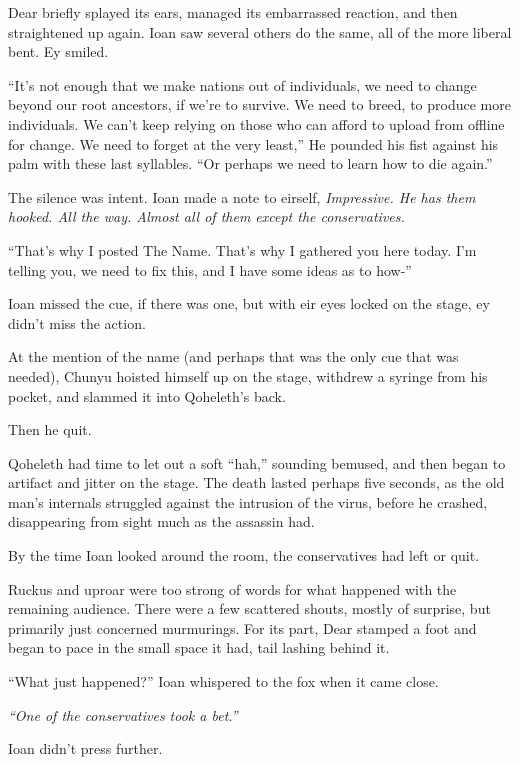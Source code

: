 Dear briefly splayed its ears, managed its embarrassed reaction, and then straightened up again. Ioan saw several others do the same, all of the more liberal bent. Ey smiled.

``It's not enough that we make nations out of individuals, we need to change beyond our root ancestors, if we're to survive. We need to breed, to produce more individuals. We can't keep relying on those who can afford to upload from offline for change. We need to forget at the very least,'' He pounded his fist against his palm with these last syllables. ``Or perhaps we need to learn how to die again.''

The silence was intent. Ioan made a note to eirself, \emph{Impressive. He has them hooked. All the way. Almost all of them except the conservatives.}

``That's why I posted The Name. That's why I gathered you here today. I'm telling you, we need to fix this, and I have some ideas as to how-''

Ioan missed the cue, if there was one, but with eir eyes locked on the stage, ey didn't miss the action.

At the mention of the name (and perhaps that was the only cue that was needed), Chunyu hoisted himself up on the stage, withdrew a syringe from his pocket, and slammed it into Qoheleth's back.

Then he quit.

Qoheleth had time to let out a soft ``hah,'' sounding bemused, and then began to artifact and jitter on the stage. The death lasted perhaps five seconds, as the old man's internals struggled against the intrusion of the virus, before he crashed, disappearing from sight much as the assassin had.

By the time Ioan looked around the room, the conservatives had left or quit.

Ruckus and uproar were too strong of words for what happened with the remaining audience. There were a few scattered shouts, mostly of surprise, but primarily just concerned murmurings. For its part, Dear stamped a foot and began to pace in the small space it had, tail lashing behind it.

``What just happened?'' Ioan whispered to the fox when it came close.

\emph{``One of the conservatives took a bet.''}

Ioan didn't press further.
